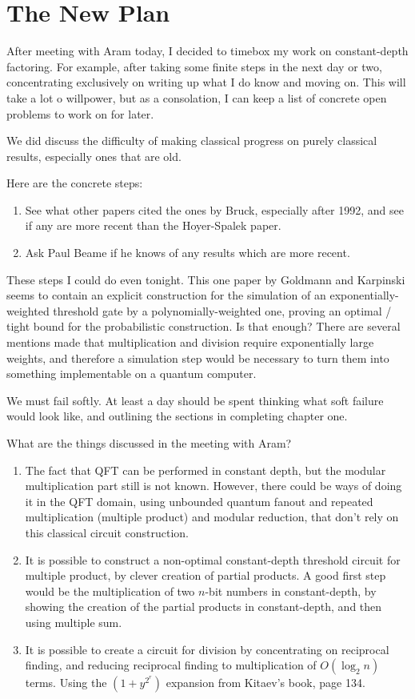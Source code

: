 \documentclass{article}
\begin{document}
\section{The New Plan}

After meeting with Aram today, I decided to timebox my work on
constant-depth factoring. For example, after taking some finite steps
in the next day or two, concentrating exclusively on writing up what I do
know and moving on. This will take a lot o willpower, but as a consolation,
I can keep a list of concrete open problems to work on for later.

We did discuss the difficulty of making classical progress on purely
classical results, especially ones that are old.

Here are the concrete steps:

\begin{enumerate}
\item
See what other papers cited the ones by Bruck, especially after 1992,
and see if any are more recent than the Hoyer-Spalek paper.
\item
Ask Paul Beame if he knows of any results which are more recent.
\end{enumerate}

These steps I could do even tonight.
This one paper by Goldmann and Karpinski seems to contain an explicit
construction for the simulation of an exponentially-weighted threshold
gate by a polynomially-weighted one, proving an optimal / tight bound
for the probabilistic construction. Is that enough? There are several
mentions made that multiplication and division require exponentially
large weights, and therefore a simulation step would be necessary to
turn them into something implementable on a quantum computer.

We must fail softly. At least a day should be spent thinking what
soft failure would look like, and outlining the sections in completing
chapter one.

What are the things discussed in the meeting with Aram?

\begin{enumerate}
\item
The fact that QFT can be performed in constant depth, but the modular
multiplication part still is not known. However, there could be ways of
doing it in the QFT domain, using unbounded quantum fanout and repeated
multiplication (multiple product) and modular reduction, that don't
rely on this classical circuit construction.
\item
It is possible to construct a non-optimal constant-depth threshold circuit
for multiple product, by clever creation of partial products. A good first
step would be the multiplication of two $n$-bit numbers in constant-depth,
by showing the creation of the partial products in constant-depth, and then
using multiple sum.
\item
It is possible to create a circuit for division by concentrating on
reciprocal finding, and reducing reciprocal finding to multiplication
of $O(\log_2 n)$ terms. Using the $(1 + y^{2^r})$ expansion from
Kitaev's book, page 134.
\end{enumerate}
\end{document}
